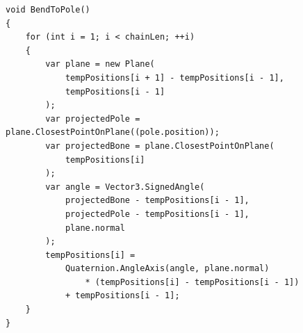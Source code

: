 \begin{lstlisting}[basicstyle=\linespread{0.9}\footnotesize\ttfamily, numbers=none,frame=single,
caption={Pole target constraint. \textit{Fabrik.cs}},captionpos=t, label=poles, language={[Sharp]c},
float=tp]
void BendToPole()
{
    for (int i = 1; i < chainLen; ++i)
    {
        var plane = new Plane(
            tempPositions[i + 1] - tempPositions[i - 1],
            tempPositions[i - 1]
        );
        var projectedPole = plane.ClosestPointOnPlane((pole.position));
        var projectedBone = plane.ClosestPointOnPlane(
            tempPositions[i]
        );
        var angle = Vector3.SignedAngle(
            projectedBone - tempPositions[i - 1],
            projectedPole - tempPositions[i - 1],
            plane.normal
        );
        tempPositions[i] =
            Quaternion.AngleAxis(angle, plane.normal)
                * (tempPositions[i] - tempPositions[i - 1])
            + tempPositions[i - 1];
    }
}
\end{lstlisting}


